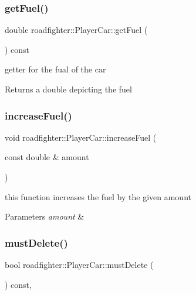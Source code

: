 \subsubsection{\texorpdfstring{get\+Fuel()}{getFuel()}}
{\footnotesize\ttfamily double roadfighter\+::\+Player\+Car\+::get\+Fuel (\begin{DoxyParamCaption}{ }\end{DoxyParamCaption}) const}

getter for the fual of the car \begin{DoxyReturn}{Returns}
a double depicting the fuel 
\end{DoxyReturn}
\mbox{\label{classroadfighter_1_1PlayerCar_ac313f0e4a46a6aa155936d3d8154ec4a}} 
\subsubsection{\texorpdfstring{increase\+Fuel()}{increaseFuel()}}
{\footnotesize\ttfamily void roadfighter\+::\+Player\+Car\+::increase\+Fuel (\begin{DoxyParamCaption}\item[{const double \&}]{amount }\end{DoxyParamCaption})}

this function increases the fuel by the given amount 
\begin{DoxyParams}{Parameters}
{\em amount} & \\
\hline
\end{DoxyParams}
\mbox{\label{classroadfighter_1_1PlayerCar_aaf4dc181a4d21e544aecd7a8e538cfd6}} 
\subsubsection{\texorpdfstring{must\+Delete()}{mustDelete()}}
{\footnotesize\ttfamily bool roadfighter\+::\+Player\+Car\+::must\+Delete (\begin{DoxyParamCaption}{ }\end{DoxyParamCaption}) const\hspace{0.3cm}{\ttfamily [override]}, {\ttfamily [virtual]}}

